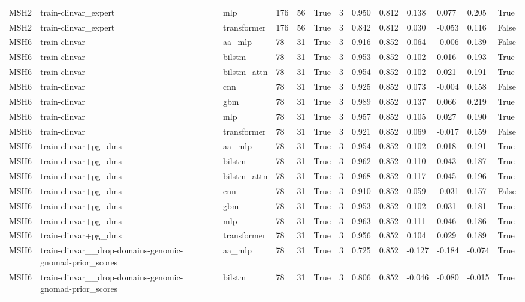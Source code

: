 \begin{table}[t]
\begin{tabular}{lllllllllllll}
MSH2 & train-clinvar\_expert & mlp & 176 & 56 & True & 3 & 0.950 & 0.812 & 0.138 & 0.077 & 0.205 & True \\
MSH2 & train-clinvar\_expert & transformer & 176 & 56 & True & 3 & 0.842 & 0.812 & 0.030 & -0.053 & 0.116 & False \\
MSH6 & train-clinvar & aa\_mlp & 78 & 31 & True & 3 & 0.916 & 0.852 & 0.064 & -0.006 & 0.139 & False \\
MSH6 & train-clinvar & bilstm & 78 & 31 & True & 3 & 0.953 & 0.852 & 0.102 & 0.016 & 0.193 & True \\
MSH6 & train-clinvar & bilstm\_attn & 78 & 31 & True & 3 & 0.954 & 0.852 & 0.102 & 0.021 & 0.191 & True \\
MSH6 & train-clinvar & cnn & 78 & 31 & True & 3 & 0.925 & 0.852 & 0.073 & -0.004 & 0.158 & False \\
MSH6 & train-clinvar & gbm & 78 & 31 & True & 3 & 0.989 & 0.852 & 0.137 & 0.066 & 0.219 & True \\
MSH6 & train-clinvar & mlp & 78 & 31 & True & 3 & 0.957 & 0.852 & 0.105 & 0.027 & 0.190 & True \\
MSH6 & train-clinvar & transformer & 78 & 31 & True & 3 & 0.921 & 0.852 & 0.069 & -0.017 & 0.159 & False \\
MSH6 & train-clinvar+pg\_dms & aa\_mlp & 78 & 31 & True & 3 & 0.954 & 0.852 & 0.102 & 0.018 & 0.191 & True \\
MSH6 & train-clinvar+pg\_dms & bilstm & 78 & 31 & True & 3 & 0.962 & 0.852 & 0.110 & 0.043 & 0.187 & True \\
MSH6 & train-clinvar+pg\_dms & bilstm\_attn & 78 & 31 & True & 3 & 0.968 & 0.852 & 0.117 & 0.045 & 0.196 & True \\
MSH6 & train-clinvar+pg\_dms & cnn & 78 & 31 & True & 3 & 0.910 & 0.852 & 0.059 & -0.031 & 0.157 & False \\
MSH6 & train-clinvar+pg\_dms & gbm & 78 & 31 & True & 3 & 0.953 & 0.852 & 0.102 & 0.031 & 0.181 & True \\
MSH6 & train-clinvar+pg\_dms & mlp & 78 & 31 & True & 3 & 0.963 & 0.852 & 0.111 & 0.046 & 0.186 & True \\
MSH6 & train-clinvar+pg\_dms & transformer & 78 & 31 & True & 3 & 0.956 & 0.852 & 0.104 & 0.029 & 0.189 & True \\
MSH6 & train-clinvar\_\_drop-domains-genomic-gnomad-prior\_scores & aa\_mlp & 78 & 31 & True & 3 & 0.725 & 0.852 & -0.127 & -0.184 & -0.074 & True \\
MSH6 & train-clinvar\_\_drop-domains-genomic-gnomad-prior\_scores & bilstm & 78 & 31 & True & 3 & 0.806 & 0.852 & -0.046 & -0.080 & -0.015 & True \\

\end{tabular}
\end{table}

